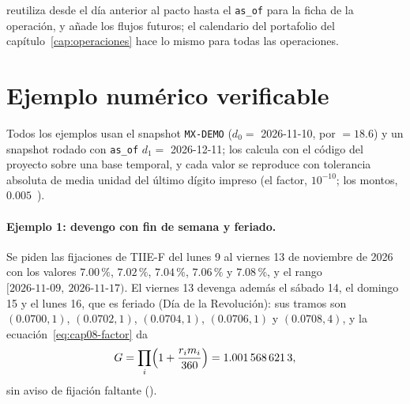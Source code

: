  reutiliza  desde el día anterior al pacto hasta el \texttt{as\_of} para la ficha de la operación, y  añade los flujos futuros; el calendario del portafolio del capítulo~\ref{cap:operaciones} hace lo mismo para todas las operaciones.

\section{Ejemplo numérico verificable}\label{sec:cap08-ejemplo}

Todos los ejemplos usan el snapshot \texttt{MX-DEMO} ($d_0 = $ 2026-11-10, \MXN por \USD $=18.6$) y un snapshot rodado con \texttt{as\_of} $d_1 = $ 2026-12-11; los calcula  con el código del proyecto sobre una base temporal, y cada valor se reproduce con tolerancia absoluta de media unidad del último dígito impreso (el factor, $10^{-10}$; los montos, $0.005$~\MXN).

\paragraph{Ejemplo 1: devengo con fin de semana y feriado.} Se piden las fijaciones de TIIE-F del lunes 9 al viernes 13 de noviembre de 2026 con los valores $7.00\,\%$, $7.02\,\%$, $7.04\,\%$, $7.06\,\%$ y $7.08\,\%$, y el rango $[2026\text{-}11\text{-}09,\ 2026\text{-}11\text{-}17)$. El viernes 13 devenga además el sábado 14, el domingo 15 y el lunes 16, que es feriado (Día de la Revolución): sus tramos son $(0.0700, 1)$, $(0.0702, 1)$, $(0.0704, 1)$, $(0.0706, 1)$ y $(0.0708, 4)$, y la ecuación~\eqref{eq:cap08-factor} da
\[
  G = \prod_i \Bigl(1 + \frac{r_i m_i}{360}\Bigr) = \verif{cap08-factor-semana}{1.0015686213},
\]
sin aviso de fijación faltante ().

